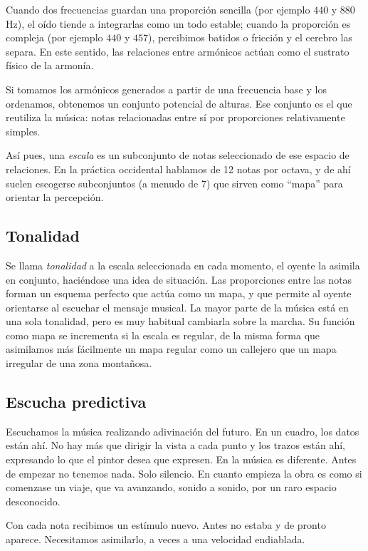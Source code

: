 \documentclass[]{report}
\begin{document}
Cuando dos frecuencias guardan una proporción sencilla (por ejemplo $440$ y $880$ Hz), el oído tiende a integrarlas como un todo estable; cuando la proporción es compleja (por ejemplo $440$ y $457$), percibimos batidos o fricción y el cerebro las separa. En este sentido, las relaciones entre armónicos actúan como el sustrato físico de la armonía.

Si tomamos los armónicos generados a partir de una frecuencia base y los ordenamos, obtenemos un conjunto potencial de alturas. Ese conjunto es el que reutiliza la música: notas relacionadas entre sí por proporciones relativamente simples.

Así pues, una \emph{escala} es un subconjunto de notas seleccionado de ese espacio de relaciones. En la práctica occidental hablamos de 12 notas por octava, y de ahí suelen escogerse subconjuntos (a menudo de 7) que sirven como ``mapa'' para orientar la percepción.

\subsection{Tonalidad}

Se llama \emph{tonalidad} a la escala seleccionada en cada momento, el oyente la asimila en conjunto, haciéndose una idea de situación. Las proporciones entre las notas forman un esquema perfecto que actúa como un mapa, y que permite al oyente orientarse al escuchar el mensaje musical. La mayor parte de la música está en una sola tonalidad, pero es muy habitual cambiarla sobre la marcha. Su función como mapa se incrementa si la escala es regular, de la misma forma que asimilamos más fácilmente un mapa regular como un callejero que un mapa irregular de una zona montañosa.

\subsection{Escucha predictiva}

Escuchamos la música realizando adivinación del futuro. En un cuadro, los datos están ahí. No hay más que dirigir la vista a cada punto y los trazos están ahí, expresando lo que el pintor desea que expresen. En la música es diferente. Antes de empezar no tenemos nada. Solo silencio. En cuanto empieza la obra es como si comenzase un viaje, que va avanzando, sonido a sonido, por un raro espacio desconocido.

Con cada nota recibimos un estímulo nuevo. Antes no estaba y de pronto aparece. Necesitamos asimilarlo, a veces a una velocidad endiablada.
\end{document}
